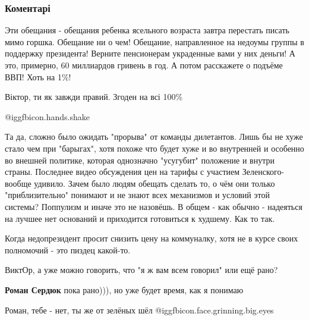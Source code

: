  
 
 
 
 
\subsubsection{Коментарі}

\begin{itemize} %

Эти обещания - обещания ребенка ясельного возраста завтра перестать писать мимо
горшка. Обещание ни о чем! Обещание, направленное на недоумы группы в поддержку
президента! Верните пенсионерам украденные вами у них деньги! А это, примерно,
60 миллиардов гривень в год. А потом расскажете о подъёме ВВП! Хоть на 1\%!


Віктор, ти як завжди правий. Згоден на всі 100\%

 @igg{fbicon.hands.shake} 


Та да, сложно было ожидать "прорыва" от команды дилетантов. Лишь бы не хуже
стало чем при "барыгах", хотя похоже что будет хуже и во внутренней и особенно
во внешней политике, которая однозначно "усугубит" положение и внутри страны.
Последнее видео обсуждения цен на тарифы с участием Зеленского- вообще удивило.
Зачем было людям обещать сделать то, о чём они только "приблизительно" понимают
и не знают всех механизмов и условий этой системы? Поппулизм и иначе это не
назовёшь. В общем - как обычно - надеяться на лучшее нет оснований и приходится
готовиться к худшему. Как то так.

Когда недопрезидент просит снизить цену на коммуналку, хотя не в курсе своих полномочий - это пиздец какой-то.

ВиктОр, а уже можно говорить, что "я ж вам всем говорил" или ещё рано?

\begin{itemize} %
\textbf{Роман Сердюк} пока рано))), но уже будет время, как я понимаю

Роман, тебе - нет, ты же от зелёных шёл  @igg{fbicon.face.grinning.big.eyes} 


\end{itemize}
\end{itemize}
